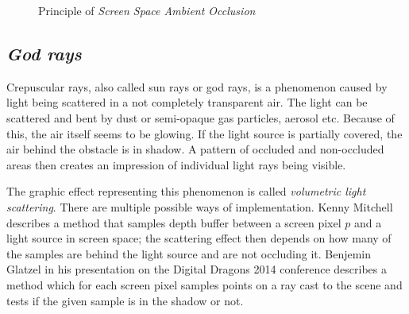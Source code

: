 \begin{figure}[H]
	\centering
	\caption{Principle of \textit{Screen Space Ambient Occlusion}}
	\label{ssaoPrinciple}
\end{figure}\vspace{5mm}

\subsection{\textit{God rays}}
Crepuscular rays, also called sun rays or god rays, is a phenomenon caused by light being scattered in a not completely transparent air. The light can be scattered and bent by dust or semi-opaque gas particles, aerosol etc. Because of this, the air itself seems to be glowing. If the light source is partially covered, the air behind the obstacle is in shadow. A pattern of occluded and non-occluded areas then creates an impression of individual light rays being visible.

The graphic effect representing this phenomenon is called \textit{volumetric light scattering}. There are multiple possible ways of implementation. Kenny Mitchell \cite{2008Gg3} describes a method that samples depth buffer between a screen pixel $p$ and a light source in screen space; the scattering effect then depends on how many of the samples are behind the light source and are not occluding it. Benjemin Glatzel in his presentation on the Digital Dragons 2014 conference \cite{KAJXNthgvW2QWSpF} describes a method which for each screen pixel samples points on a ray cast to the scene and tests if the given sample is in the shadow or not.

